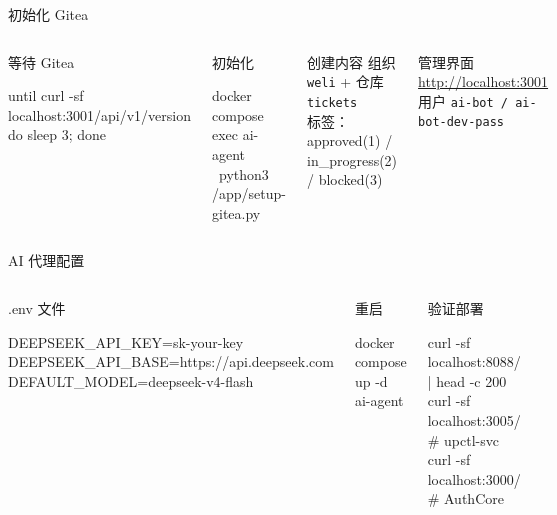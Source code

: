 \documentclass[10pt,aspectratio=169,utf8]{beamer}
\begin{document}
\begin{frame}[fragile]{初始化 Gitea}
  \begin{columns}[T]
    \begin{block}{等待 Gitea}
      \begin{code}
until curl -sf localhost:3001/api/v1/version
do sleep 3; done
      \end{code}
    \end{block}
    \begin{block}{初始化}
      \begin{code}
docker compose exec ai-agent \
  python3 /app/setup-gitea.py
      \end{code}
    \end{block}

    \begin{block}{创建内容}
      \footnotesize
      组织 \texttt{weli} + 仓库 \texttt{tickets}\\
      标签：approved(1) / in\_progress(2) / blocked(3)
    \end{block}
    \begin{exampleblock}{管理界面}
      \footnotesize
      \url{http://localhost:3001} \\
      用户 \texttt{ai-bot / ai-bot-dev-pass}
    \end{exampleblock}
  \end{columns}
\end{frame}

\begin{frame}[fragile]{AI 代理配置}
  \begin{columns}[T]
    \column{0.48\textwidth}
    \begin{block}{.env 文件}
      \begin{code}
DEEPSEEK_API_KEY=sk-your-key
DEEPSEEK_API_BASE=https://api.deepseek.com
DEFAULT_MODEL=deepseek-v4-flash
      \end{code}
    \end{block}
    \begin{block}{重启}
      \begin{code}
docker compose up -d ai-agent
      \end{code}
    \end{block}

    \column{0.48\textwidth}
    \begin{exampleblock}{验证部署}
      \footnotesize
      \begin{code}
curl -sf localhost:8088/ | head -c 200
curl -sf localhost:3005/   # upctl-svc
curl -sf localhost:3000/   # AuthCore
      \end{code}
    \end{exampleblock}
  \end{columns}
\end{frame}
\end{document}
